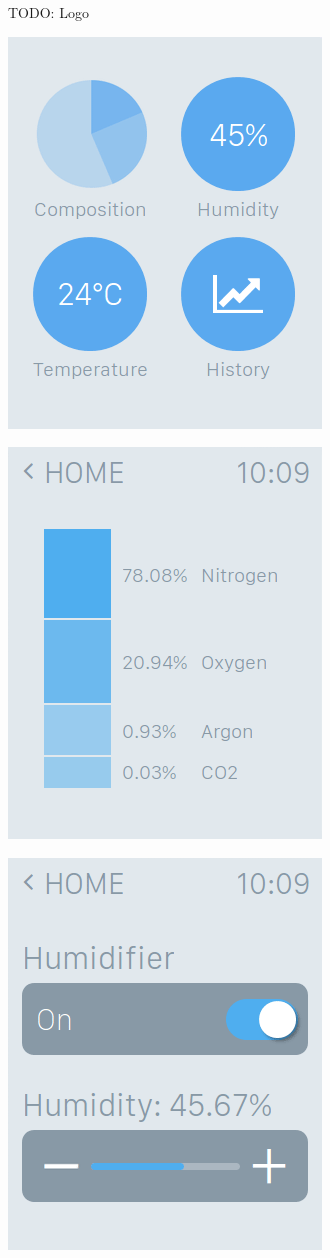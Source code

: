 \documentclass[a4paper,10pt]{article}
\begin{document}
TODO: Logo

\includegraphics[scale=0.4]{images/home.png}

\includegraphics[scale=0.4]{images/composition.png}

\includegraphics[scale=0.4]{images/humidity.png}
\end{document}

